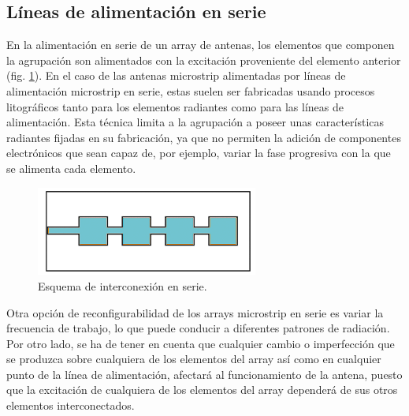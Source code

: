 \subsection{Líneas de alimentación en serie}
\par En la alimentación en serie de un array de antenas, los elementos  que componen la agrupación son alimentados con la excitación proveniente del elemento anterior (fig. \ref{fig:seriesfeed}). En el caso de las antenas microstrip alimentadas por líneas de alimentación microstrip en serie, estas suelen ser fabricadas usando procesos litográficos tanto para los elementos radiantes como para las líneas de alimentación. Esta técnica limita a la agrupación a poseer unas características radiantes fijadas en su fabricación, ya que no permiten la adición de componentes electrónicos que sean capaz de, por ejemplo, variar la fase progresiva con la que se alimenta cada elemento. \cite{Balanis2015}
\\
\begin{figure}[h]
    \centering
        \includegraphics[width=0.65\textwidth]{archivos/array/series}
        \caption{Esquema de interconexión en serie. \cite{Balanis2015}}
        \label{fig:seriesfeed}
\end{figure}

\par Otra opción de reconfigurabilidad de los arrays microstrip en serie es variar la frecuencia de trabajo, lo que puede conducir a diferentes patrones de radiación. Por otro lado, se ha de tener en cuenta que cualquier cambio o imperfección que se produzca sobre cualquiera de los elementos del array así como en cualquier punto de la línea de alimentación, afectará al funcionamiento de la antena, puesto que la excitación de cualquiera de los elementos del array dependerá de sus otros elementos interconectados. \cite{Balanis2015}

